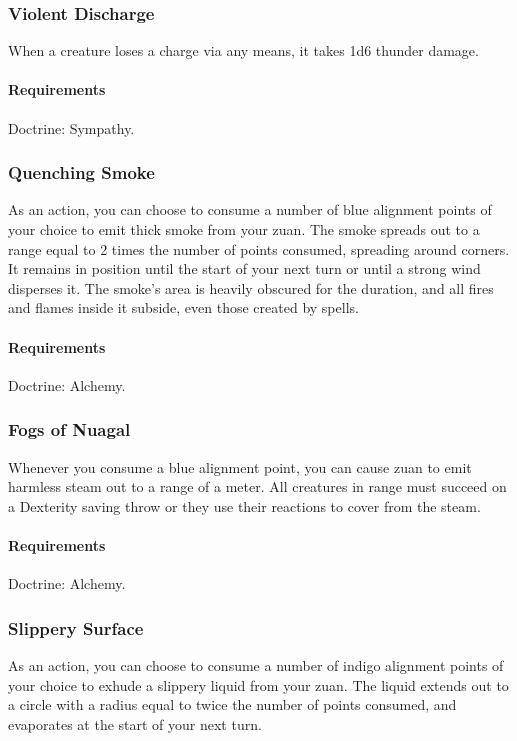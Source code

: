 \subsubsection{Violent Discharge} \label{feat::violentdischarge}
    When a creature loses a charge via any means, it takes 1d6 thunder damage.
    \paragraph{Requirements} Doctrine: Sympathy.

\subsubsection{Quenching Smoke} \label{feat::quenchingsmoke}
    As an action, you can choose to consume a number of blue alignment points of your choice to emit thick smoke from your zuan.
    The smoke spreads out to a range equal to 2 times the number of points consumed, spreading around corners.
    It remains in position until the start of your next turn or until a strong wind disperses it.
    The smoke's area is heavily obscured for the duration, and all fires and flames inside it subside, even those created by spells.
    \paragraph{Requirements} Doctrine: Alchemy.
\subsubsection{Fogs of Nuagal} \label{feat::fogsofnuagal}
    Whenever you consume a blue alignment point, you can cause zuan to emit harmless steam out to a range of a meter.
    All creatures in range must succeed on a Dexterity saving throw or they use their reactions to cover from the steam.
    \paragraph{Requirements} Doctrine: Alchemy.
\subsubsection{Slippery Surface} \label{feat::slipperysurface}
    As an action, you can choose to consume a number of indigo alignment points of your choice to exhude a slippery liquid from your zuan.
    The liquid extends out to a circle with a radius equal to twice the number of points consumed, and evaporates at the start of your next turn.


